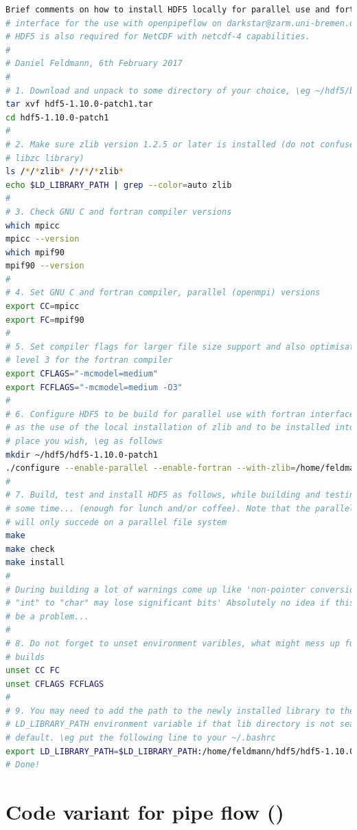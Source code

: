 \documentclass[a4paper, 11pt, DIV=11]{scrartcl}
\begin{document}
\begin{lstlisting}[language=bash]
 Brief comments on how to install HDF5 locally for parallel use and fortran
# interface for the use with openpipeflow on darkstar@zarm.uni-bremen.de
# HDF5 is also required for NetCDF with netcdf-4 capabilities.
#
# Daniel Feldmann, 6th February 2017
#
# 1. Download and unpack to some directory of your choice, \eg ~/hdf5/build/.
tar xvf hdf5-1.10.0-patch1.tar
cd hdf5-1.10.0-patch1
#
# 2. Make sure zlib version 1.2.5 or later is installed (do not confuse with
# libzc library)
ls /*/*zlib* /*/*/*zlib*
echo $LD_LIBRARY_PATH | grep --color=auto zlib
#
# 3. Check GNU C and fortran compiler versions
which mpicc
mpicc --version
which mpif90
mpif90 --version
#
# 4. Set GNU C and fortran compiler, parallel (openmpi) versions
export CC=mpicc
export FC=mpif90
#
# 5. Set compiler flags for larger file size support and also optimisation
# level 3 for the fortran compiler
export CFLAGS="-mcmodel=medium"
export FCFLAGS="-mcmodel=medium -O3"
#
# 6. Configure HDF5 to be build for parallel use with fortran interface, as well
# as the use of the local installation of zlib and to be installed into some
# place you wish, \eg as follows
mkdir ~/hdf5/hdf5-1.10.0-patch1
./configure --enable-parallel --enable-fortran --with-zlib=/home/feldmann/zlib/zlib-1.2.11 --prefix=/home/feldmann/hdf5/hdf5-1.10.0-patch1
#
# 7. Build, test and install HDF5 as follows, while building and testing take quite
# some time... (enough for lunch and/or coffee). Note that the parallel tests
# will only succede on a parallel file system
make
make check
make install
#
# During building a lot of warnings come up like 'non-pointer conversion from
# "int" to "char" may lose significant bits' Absolutely no idea if this might
# be a problem...
#
# 8. Do not forget to unset environment varibles, what might mess up future
# builds
unset CC FC
unset CFLAGS FCFLAGS
#
# 9. You may need to add the path to the newly installed library to the
# LD_LIBRARY_PATH environment variable if that lib directory is not searched by
# default. \eg put the following line to your ~/.bashrc
export LD_LIBRARY_PATH=$LD_LIBRARY_PATH:/home/feldmann/hdf5/hdf5-1.10.0-patch1/lib
# Done!
\end{lstlisting}

\section{Code variant for pipe flow (\nsp)}
\label{sec:nsPipe}
\end{document}
